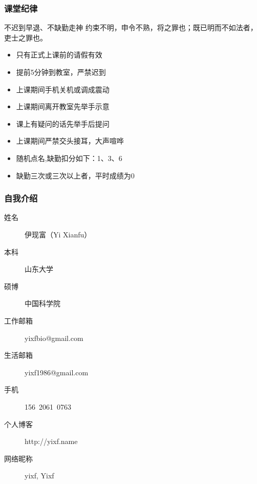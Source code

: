 \begin{frame}
  \frametitle{课堂纪律}
  \begin{alertblock}{不迟到早退、不缺勤走神}
  约束不明，申令不熟，将之罪也；既已明而不如法者，吏士之罪也。
  \end{alertblock}
  \pause
  \begin{itemize}[<+-|alert@+>]
    \item 只有正式上课前的请假有效
    \item 提前5分钟到教室，严禁迟到
    \item 上课期间手机关机或调成震动
    \item 上课期间离开教室先举手示意
    \item 课上有疑问的话先举手后提问
    \item 上课期间严禁交头接耳，大声喧哗
    \item 随机点名,缺勤扣分如下：1、3、6
    \item 缺勤三次或三次以上者，平时成绩为0
  \end{itemize}
\end{frame}

\begin{frame}
  \frametitle{自我介绍}
    \begin{description}
      \item[姓\qquad 名]伊现富（Yi Xianfu）
      \item[本\qquad 科]山东大学
      \item[硕\qquad 博]中国科学院
      \item[工作邮箱]\alert{yixfbio@gmail.com}
      \item[生活邮箱]yixf1986@gmail.com
      \item[手\qquad 机]156\ 2061\ 0763
      \item[个人博客]http://yixf.name
      \item[网络昵称]yixf, Yixf
    \end{description}
\end{frame}


